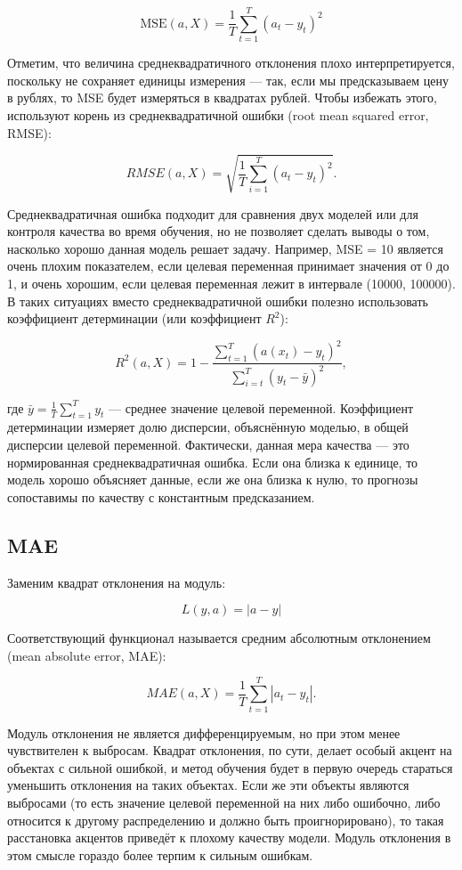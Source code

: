 \[ \text{MSE}(a, X) = \frac{1}{T} \sum_{t=1}^{T} (a_t - y_t)^2 \]

Отметим, что величина среднеквадратичного отклонения плохо
интерпретируется, поскольку не сохраняет единицы измерения — так,
если мы предсказываем цену в рублях, то MSE будет измеряться в
квадратах рублей. Чтобы избежать этого, используют корень из
среднеквадратичной ошибки (root mean squared error, RMSE):

\[
  RMSE(a, X) = \sqrt{\frac{1}{T} \sum_{i=1}^{T} (a_t - y_t)^2}.
\]

Среднеквадратичная ошибка подходит для сравнения двух моделей или для
контроля качества во время обучения, но не позволяет сделать выводы о
том, насколько хорошо данная модель решает задачу. Например, MSE = 10
является очень плохим показателем, если целевая переменная принимает
значения от 0 до 1, и очень хорошим, если целевая переменная лежит в
интервале (10000, 100000). В таких ситуациях вместо
среднеквадратичной ошибки полезно использовать коэффициент
детерминации (или коэффициент $R^2$):

\[
  R^2(a, X) = 1 - \frac{\sum_{t=1}^{T} (a(x_t) -
  y_t)^2}{\sum_{i=t}^{T} (y_t - \bar{y})^2},
\]

где $\bar{y} = \frac{1}{T} \sum_{t=1}^{T} y_t$ — среднее значение
целевой переменной. Коэффициент детерминации измеряет долю дисперсии,
объяснённую моделью, в общей дисперсии целевой переменной.
Фактически, данная мера качества — это нормированная
среднеквадратичная ошибка. Если она близка к единице, то модель
хорошо объясняет данные, если же она близка к нулю, то прогнозы
сопоставимы по качеству с константным предсказанием.

\subsection*{MAE}
Заменим квадрат отклонения на модуль:

\[
  L(y, a) = |a - y|
\]

Соответствующий функционал называется средним абсолютным отклонением
(mean absolute error, MAE):

\[
  MAE(a, X) = \frac{1}{T} \sum_{t=1}^{T} |a_t - y_t|.
\]

Модуль отклонения не является дифференцируемым, но при этом менее
чувствителен к выбросам. Квадрат отклонения, по сути, делает особый
акцент на объектах с сильной ошибкой, и метод обучения будет в первую
очередь стараться уменьшить отклонения на таких объектах. Если же эти
объекты являются выбросами (то есть значение целевой переменной на
  них либо ошибочно, либо относится к другому распределению и должно
быть проигнорировано), то такая расстановка акцентов приведёт к
плохому качеству модели. Модуль отклонения в этом смысле гораздо
более терпим к сильным ошибкам.

